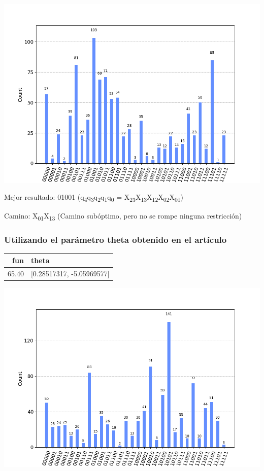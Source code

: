 \documentclass[letterpaper]{article}
\begin{document}
\begin{center}
\includegraphics[scale=0.5]{./img/primer_paper_aer_suboptimo.png}
\end{center}

Mejor resultado: 01001 (q\textsubscript{4}q\textsubscript{3}q\textsubscript{2}q\textsubscript{1}q\textsubscript{0} = X\textsubscript{23}X\textsubscript{13}X\textsubscript{12}X\textsubscript{02}X\textsubscript{01})

Camino: X\textsubscript{01}X\textsubscript{13} (Camino subóptimo, pero no se rompe ninguna restricción)

\newpage

\subsubsection{Utilizando el parámetro \textbf{theta} obtenido en el artículo}
\label{sec:org9cfc0ff}

\begin{center}
\begin{tabular}{|r|l|}
\hline
\textbf{fun} & \textbf{theta}\\
\hline
65.40 & [0.28517317, -5.05969577]\\
\hline
\end{tabular}
\end{center}

\begin{center}
\includegraphics[scale=0.5]{./img/primer_paper_aer_resultado.png}
\end{center}
\end{document}
